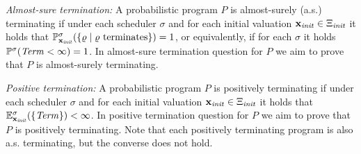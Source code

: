 \begin{compactenum}
\item \emph{Almost-sure termination:} A probabilistic program $P$ is 
almost-surely (a.s.) 
terminating if under each scheduler $\sigma$ and for each initial valuation 
$\mathbf{x}_{\mathit{init}}\in\Xi_{\mathit{init}}$ it holds that 
$\mathbb{P}^{\sigma}_{\mathbf{x}_{\mathit{init}}}(\{\varrho\mid \varrho \text{ terminates}\}) = 1$, or 
equivalently, 
if for each $\sigma$ it holds $\mathbb{P}^{\sigma}(\mathit{Term}<\infty)=1$. In 
almost-sure termination question for $P$ we aim to prove that $P$ 
is 
almost-surely terminating.
\item \emph{Positive termination:} A probabilistic program $P$ is 
positively
terminating if under each scheduler $\sigma$ and for each initial valuation 
$\mathbf{x}_{\mathit{init}}\in\Xi_{\mathit{init}}$ it holds that 
$\mathbb{E}^{\sigma}_{\mathbf{x}_{\mathit{init}}}(\{\mathit{Term}\})<  \infty$. In 
positive termination question for $P$ we aim to prove that $P$ 
is 
positively terminating. Note that each positively terminating program is also 
a.s. terminating, but the converse does not hold.
\end{compactenum}


